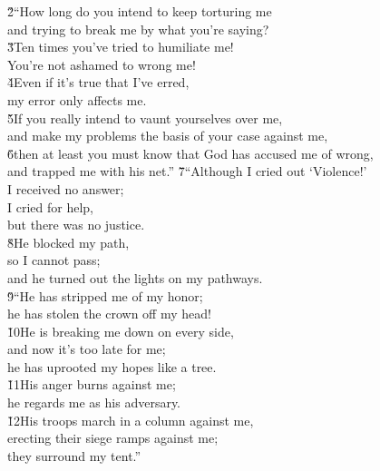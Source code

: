 \begin{poetry}
\poeml \v{2}``How long do you intend to keep torturing me \\
\poemll    and trying to break me by what you're saying? \\
\poeml \v{3}Ten times you've tried to humiliate me! \\
\poemll    You're not ashamed to wrong me! \\
\poeml \v{4}Even if it's true that I've erred, \\
\poemll    my error only affects me. \\
\poeml \v{5}If you really intend to vaunt yourselves over me, \\
\poemll    and make my problems the basis of your case against me, \\
\poeml \v{6}then at least you must know that God has accused me of wrong, \\
\poemll    and trapped me with his net.''
\poeml \v{7}``Although I cried out `Violence!' \\
\poemll    I received no answer; \\
\poeml I cried for help, \\
\poemll    but there was no justice. \\
\poeml \v{8}He blocked my path, \\
\poemll    so I cannot pass; \\
\poemlll       and he turned out the lights on my pathways. \\
\poeml \v{9}``He has stripped me of my honor; \\
\poemll    he has stolen the crown off my head! \\
\poeml \v{10}He is breaking me down on every side, \\
\poemll    and now it's too late for me; \\
\poemlll       he has uprooted my hopes like a tree. \\
\poeml \v{11}His anger burns against me; \\
\poemll    he regards me as his adversary. \\
\poeml \v{12}His troops march in a column against me, \\
\poemll    erecting their siege ramps against me; \\
\poemlll       they surround my tent.''

\end{poetry}
